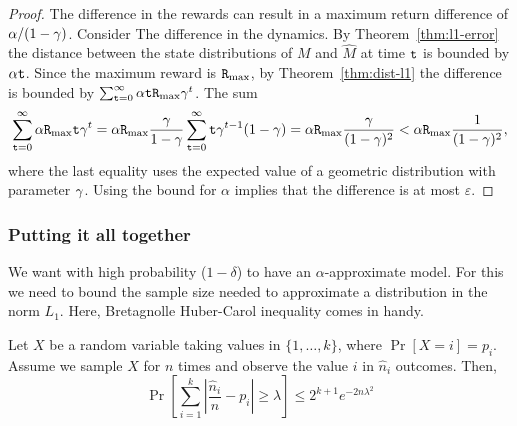 \begin{proof}
The difference in the rewards can result in a maximum return difference of $\alpha /(1-\gamma)$. 
Consider The  difference in the dynamics.
By Theorem~\ref{thm:l1-error} the distance between the state distributions of $M$ and $\widehat{M}$ at time ${\tt t}$ is bounded by $\alpha{\tt t}$. Since the maximum reward  is ${\tt R}_{\max }$, by Theorem~\ref{thm:dist-l1} the difference is bounded by
$\sum_{{\tt t}=0}^\infty \alpha{\tt t} {\tt R}_{\max }\gamma^t$.
The sum 
$$\sum_{{\tt t}=0}^\infty \alpha{\tt R}_{\max }{\tt t} \gamma^t=\alpha{\tt R}_{\max }\frac{\gamma}{1-\gamma}\sum_{{\tt t}=0}^\infty {\tt t} \gamma^{t-1}(1-\gamma)=\alpha{\tt R}_{\max }\frac{\gamma}{(1-\gamma)^2}< \alpha{\tt R}_{\max }\frac{1}{(1-\gamma)^2},$$
where the last equality uses the expected value of a geometric distribution with parameter $\gamma$.
%
Using the bound for $\alpha$ implies that the difference is at most $\varepsilon$.
%
\end{proof}

\subsubsection{Putting it all together}

We want with high probability ($1-\delta$) to have an
$\alpha$-approximate model. For this we need to bound the sample
size needed to approximate a distribution in the norm $L_1$. Here,
Bretagnolle Huber-Carol inequality comes in handy.

\begin{lemma}
\label{lemma:Bretagnolle Huber-Carol}
Let $X$ be a random variable taking values in $\{1, \ldots , k\}$,
where $\Pr[X=i]=p_i$. Assume we sample $X$ for $n$ times and
observe the value $i$ in $\hat{n}_i$ outcomes. Then,
\[
\Pr\left[\sum_{i=1}^k \left|\frac{\hat{n}_i}{n}-p_i\right|\geq
\lambda\right]\leq 2^{k+1} e^{-2n\lambda^2}
\]
\end{lemma}

